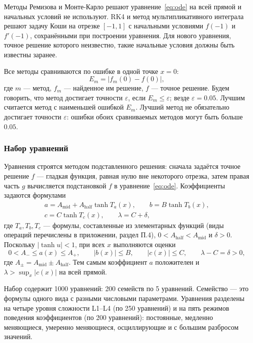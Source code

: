 \documentclass[14pt,a4paper]{extarticle}
\begin{document}
Методы Ремизова и Монте-Карло решают уравнение~\eqref{eq:ode} на всей
прямой и начальных условий не используют. RK4 и метод мультипликативного
интеграла решают задачу Коши на отрезке $[-1,1]$ с начальными условиями
$f(-1)$ и $f'(-1)$, сохранёнными при построении уравнения. Для нового
уравнения, точное решение которого неизвестно, такие начальные условия
должны быть известны заранее.

Все методы сравниваются по ошибке в одной точке $x=0$:
\begin{equation}\label{eq:ml-error}
E_m=\bigl|f_m(0)-f(0)\bigr|,
\end{equation}
где $m$ --- метод, $f_m$ --- найденное им решение, $f$ --- точное
решение. Будем говорить, что метод достигает точности $\varepsilon$,
если $E_m\le\varepsilon$; везде $\varepsilon=0.05$. Лучшим считается
метод с наименьшей ошибкой $E_m$. Лучший метод не обязательно достигает
точности $\varepsilon$: ошибки обоих сравниваемых методов могут быть
больше $0.05$.

\subsubsection{Набор уравнений}
Уравнения строятся методом подставленного решения: сначала задаётся
точное решение $f$ --- гладкая функция, равная нулю вне некоторого
отрезка, затем правая часть $g$ вычисляется подстановкой $f$
в уравнение~\eqref{eq:ode}. Коэффициенты задаются формулами
\begin{equation}\label{eq:ml-coef}
\begin{gathered}
a=A_{\mathrm{mid}}+A_{\mathrm{half}}\tanh T_a(x),\qquad
b=B\tanh T_b(x),\\
c=C\tanh T_c(x),\qquad
\lambda=C+\delta,
\end{gathered}
\end{equation}
где $T_a,T_b,T_c$ --- формулы, составленные из элементарных функций
(виды операций перечислены в приложении, раздел П.4),
$0<A_{\mathrm{half}}<A_{\mathrm{mid}}$ и $\delta>0$. Поскольку
$|\tanh u|<1$, при всех $x$ выполняются оценки
\[
0<A_-\le a(x)\le A_+,\qquad |b(x)|\le B,\qquad |c(x)|\le C,\qquad
\lambda-C=\delta>0,
\]
где $A_\pm=A_{\mathrm{mid}}\pm A_{\mathrm{half}}$. Тем самым коэффициент
$a$ положителен и $\lambda>\sup_x|c(x)|$ на всей прямой.

Набор содержит 1000 уравнений: 200 семейств по 5 уравнений. Семейство ---
это формулы одного вида с разными числовыми параметрами. Уравнения
разделены на четыре уровня сложности L1--L4 (по 250 уравнений) и на пять
режимов поведения коэффициентов (по 200 уравнений): постоянные, медленно
меняющиеся, умеренно меняющиеся, осциллирующие и с большим разбросом
значений.
\end{document}
